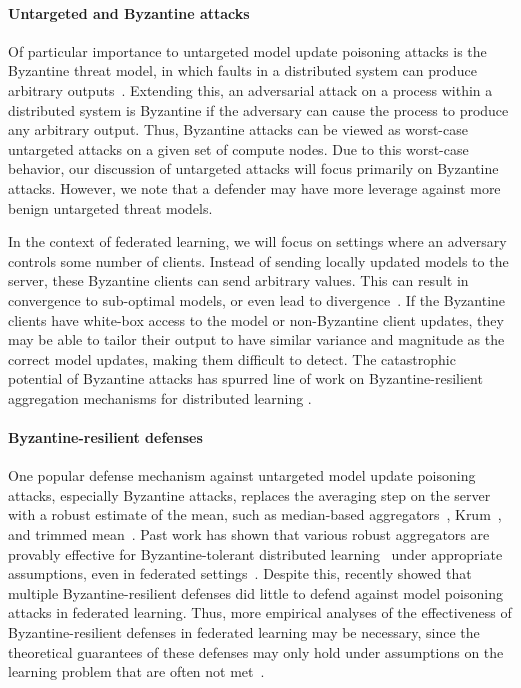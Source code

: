 \documentclass[11pt]{article}
\begin{document}
\paragraph{Untargeted and Byzantine attacks} Of particular importance to untargeted model update poisoning attacks is the Byzantine threat model, in which faults in a distributed system can produce arbitrary outputs~\citep{lamport1982byzantine}. Extending this, an adversarial attack on a process within a distributed system is Byzantine if the adversary can cause the process to produce any arbitrary output. Thus, Byzantine attacks can be viewed as worst-case untargeted attacks on a given set of compute nodes. Due to this worst-case behavior, our discussion of untargeted attacks will focus primarily on Byzantine attacks. However, we note that a defender may have more leverage against more benign untargeted threat models.

In the context of federated learning, we will focus on settings where an adversary controls some number of clients. Instead of sending locally updated models to the server, these Byzantine clients can send arbitrary values. This can result in convergence to sub-optimal models, or even lead to divergence~\citep{blanchard2017machine}. If the Byzantine clients have white-box access to the model or non-Byzantine client updates, they may be able to tailor their output to have similar variance and magnitude as the correct model updates, making them difficult to detect. The catastrophic potential of Byzantine attacks has spurred line of work on Byzantine-resilient aggregation mechanisms for distributed learning \citep{peva17, chen18draco, mhamdi2018hidden, alistarh2018byzantine, yin2018byzantine, pmlr-v97-diakonikolas19a}.

\paragraph{Byzantine-resilient defenses} One popular defense mechanism against untargeted model update poisoning attacks, especially Byzantine attacks, replaces the averaging step on the server with a robust estimate of the mean, such as median-based aggregators~\citep{Chen2017DistributedSM, yin2018byzantine},  Krum~\citep{blanchard2017machine}, and trimmed mean~\citep{yin2018byzantine}. Past work has shown that various robust aggregators are provably effective for Byzantine-tolerant distributed learning~\citep{Su2016FaultTolerantMO, blanchard2017machine, Chen2017DistributedSM} under appropriate assumptions, even in federated settings~\citep{pillutla2019robust, xie2019practicalsecure, BREA2020}. Despite this, \citet{fang2019local} recently showed that multiple Byzantine-resilient defenses did little to defend against model poisoning attacks in federated learning. Thus, more empirical analyses of the effectiveness of Byzantine-resilient defenses in federated learning may be necessary, since the theoretical guarantees of these defenses may only hold under assumptions on the learning problem that are often not met~\citep{baruch2019little, rajput2019detox}.
\end{document}

